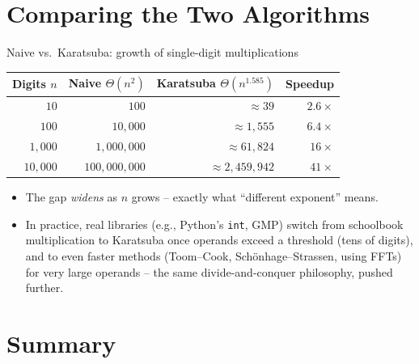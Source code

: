 \documentclass[11pt,aspectratio=169]{beamer}
\begin{document}
\section{Comparing the Two Algorithms}

\begin{frame}{Naive vs.\ Karatsuba: growth of single-digit multiplications}
  \begin{center}
  \begin{tabular}{@{}rrrr@{}}
    \toprule
    Digits $n$ & Naive $\Theta(n^2)$ & Karatsuba $\Theta(n^{1.585})$ & Speedup \\
    \midrule
    $10$    & $100$                & $\approx 39$                & $2.6\times$ \\
    $100$   & $10{,}000$           & $\approx 1{,}555$           & $6.4\times$ \\
    $1{,}000$ & $1{,}000{,}000$    & $\approx 61{,}824$          & $16\times$ \\
    $10{,}000$ & $100{,}000{,}000$ & $\approx 2{,}459{,}942$     & $41\times$ \\
    \bottomrule
  \end{tabular}
  \end{center}
  \vspace{1em}
  \begin{itemize}
    \item The gap \emph{widens} as $n$ grows -- exactly what ``different exponent'' means.
    \item In practice, real libraries (e.g., Python's \texttt{int}, GMP) switch from
    schoolbook multiplication to Karatsuba once operands exceed a threshold (tens of
    digits), and to even faster methods (Toom--Cook, Sch\"onhage--Strassen, using FFTs) for
    very large operands -- the same divide-and-conquer philosophy, pushed further.
  \end{itemize}
\end{frame}

\section{Summary}
\end{document}
